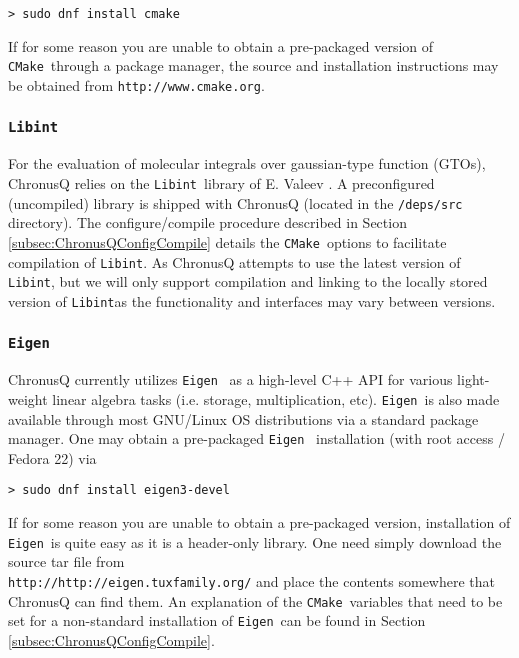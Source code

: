 \documentclass[12pt]{article}
\newcommand{\CMake}{\texttt{CMake}}
\newcommand{\Libint}{\texttt{Libint}}
\newcommand{\Eigen}{\texttt{Eigen}}
\begin{document}
	\begin{lstlisting}
> sudo dnf install cmake
	\end{lstlisting}

	\noindent If for some reason you are unable to obtain a pre-packaged 
	version of \CMake~through a package manager, the source and installation 
	instructions may be obtained from \texttt{http://www.cmake.org}.

      \subsubsection{\Libint} \label{subsubsec:Libint}
        For the evaluation of molecular integrals over gaussian-type
        function (GTOs), ChronusQ relies on the \Libint~library of E. Valeev \cite{libint15}. A
	preconfigured (uncompiled) library is shipped with ChronusQ (located in
	the \texttt{/deps/src} directory). The configure/compile procedure
	described in Section \ref{subsec:ChronusQConfigCompile} details the
	\CMake~options to facilitate compilation of \Libint. As ChronusQ attempts
	to use the latest version of \Libint, but we will only support compilation
	and linking to the locally stored version of \Libint as the functionality
	and interfaces may vary between versions.

      \subsubsection{\Eigen} \label{subsubsec:Eigen}
        ChronusQ currently utilizes \Eigen~\cite{eigen} as a high-level C++ API for
        various light-weight linear algebra tasks (i.e. storage, multiplication,
	etc). \Eigen~is also made available through most GNU/Linux OS distributions
	via a standard package manager. One may obtain a pre-packaged \Eigen~
	installation (with root access / Fedora 22) via

	\begin{lstlisting}
> sudo dnf install eigen3-devel
	\end{lstlisting}

        \noindent If for some reason you are unable to obtain a pre-packaged 
	version, installation of \Eigen~is quite easy as it is a header-only 
	library. One need simply download the source tar file from \\
	\texttt{http://http://eigen.tuxfamily.org/} and place the contents 
	somewhere that ChronusQ can find them. An explanation of the 
	\CMake~variables that need to be set for a non-standard installation 
	of \Eigen~can be found
	in Section \ref{subsec:ChronusQConfigCompile}.
\end{document}
